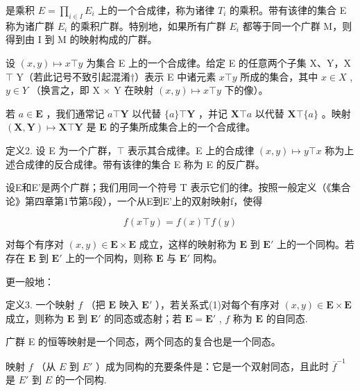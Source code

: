是乘积 \(E = \prod_{i \in I} E_i\) 上的一个合成律，称为诸律 \(T_i\) 的乘积。带有该律的集合 E 称为诸广群 \(E_i\) 的乘积广群。特别地，如果所有广群 \(E_i\) 都等于同一个广群 M，则得到由 I 到 M 的映射构成的广群。

设 \((x,y)\mapsto x\top y\) 为集合 E 上的一个合成律。给定 E 的任意两个子集 X、Y，X \(\top\) Y（若此记号不致引起混淆†）表示 E 中诸元素 \(x\top y\) 所成的集合，其中 \(x\in X\) , \(y\in Y\) （换言之，即 X \(\times\) Y 在映射 \((x,y)\mapsto x\top y\) 下的像）。

若 \(a \in \mathbf{E}\) ，我们通常记 \(a \top \mathbf{Y}\) 以代替 \(\{a\} \top \mathbf{Y}\) ，并记 \(\mathbf{X} \top a\) 以代替 \(\mathbf{X} \top \{a\}\) 。映射 \((\mathbf{X}, \mathbf{Y}) \mapsto \mathbf{X} \top \mathbf{Y}\) 是 \(\mathbf{E}\) 的子集所成集合上的一个合成律。

定义2. 设 E 为一个广群，\(\top\) 表示其合成律。E 上的合成律 \((x, y) \mapsto y \top x\) 称为上述合成律的反合成律。带有该律的集合 E 称为 E 的反广群。

设E和E'是两个广群；我们用同一个符号 T 表示它们的律。按照一般定义（《集合论》第四章第1节第5段），一个从E到E'上的双射映射f，使得

\[
f (x \top y) = f (x) \top f (y)\tag{1}
\]

对每个有序对 \((x, y) \in \mathbf{E} \times \mathbf{E}\) 成立，这样的映射称为 \(\mathbf{E}\) 到 \(\mathbf{E}'\) 上的一个同构。若存在 \(\mathbf{E}\) 到 \(\mathbf{E}'\) 上的一个同构，则称 \(\mathbf{E}\) 与 \(\mathbf{E}'\) 同构。

更一般地：

定义3. 一个映射 \(f\) （把 \(\mathbf{E}\) 映入 \(\mathbf{E}'\) ），若关系式(1)对每个有序对 \((x, y) \in \mathbf{E} \times \mathbf{E}\) 成立，则称为 \(\mathbf{E}\) 到 \(\mathbf{E}'\) 的同态或态射；若 \(\mathbf{E} = \mathbf{E}'\) , \(f\) 称为 \(\mathbf{E}\) 的自同态.

广群 E 的恒等映射是一个同态，两个同态的复合也是一个同态。

映射 \(f\) （从 \(E\) 到 \(E'\) ）成为同构的充要条件是：它是一个双射同态，且此时 \(\overline{f}^{-1}\) 是 \(E'\) 到 \(E\) 的一个同构.

